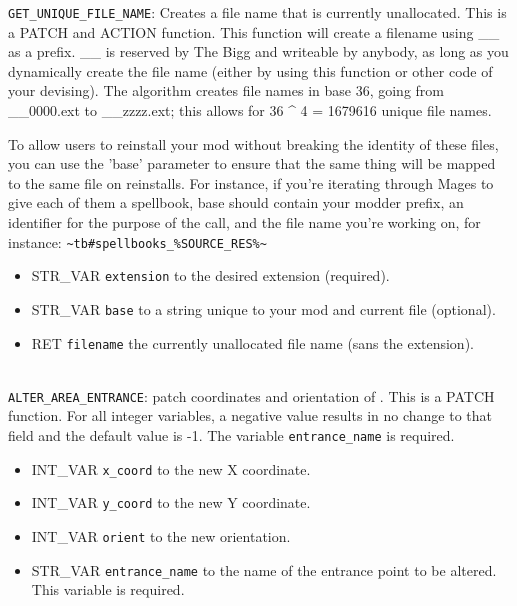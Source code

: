 \documentclass{article}
\begin{document}
\verb+GET_UNIQUE_FILE_NAME+: Creates a file name that is currently unallocated.
This is a PATCH and ACTION function.
This function will create a filename using __ as a prefix. __ is reserved by
The Bigg and writeable by anybody, as long as you dynamically create the file
name (either by using this function or other code of your devising). The algorithm
creates file names in base 36, going from __0000.ext to __zzzz.ext; this allows for
36 ^ 4 = 1679616 unique file names.



To allow users to reinstall your mod without breaking the identity of these files, you
can use the 'base' parameter to ensure that the same thing will be mapped to the same
file on reinstalls. For instance, if you're iterating through Mages to give each of
them a spellbook, base should contain your modder prefix, an identifier for the purpose
of the call, and the file name you're working on, for instance:
\verb+~tb#spellbooks_%SOURCE_RES%~+
\begin{itemize}
\item STR_VAR \verb+extension+ to the desired extension (required).
\item STR_VAR \verb+base+ to a string unique to your mod and current file (optional).
\item RET \verb+filename+ the currently unallocated file name (sans the extension).
\end{itemize}
\\

\verb+ALTER_AREA_ENTRANCE+: patch coordinates and orientation of .
This is a PATCH function. For all integer variables, a negative value results in no change to that field and the default value is -1. The variable \verb+entrance_name+ is required.
\begin{itemize}
\item INT_VAR \verb+x_coord+ to the new X coordinate.
\item INT_VAR \verb+y_coord+ to the new Y coordinate.
\item INT_VAR \verb+orient+ to the new orientation.
\item STR_VAR \verb+entrance_name+ to the name of the entrance point to be altered. This variable is required.
\end{itemize}
\\
\end{document}

